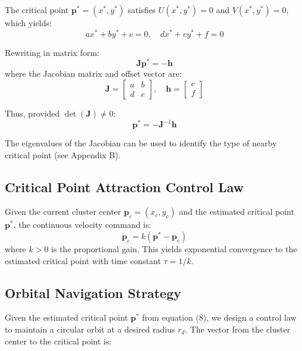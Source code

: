 \documentclass[lettersize,journal]{IEEEtran}
\begin{document}
The critical point $\mathbf{p}^* = (x^*, y^*)$ satisfies $U(x^*, y^*) = 0$ and $V(x^*, y^*) = 0$, which yields:
\begin{equation}
ax^* + by^* + c = 0, \quad dx^* + ey^* + f = 0
\end{equation}

Rewriting in matrix form:
\begin{equation}
\mathbf{J}\mathbf{p}^* = -\mathbf{h}
\end{equation}
where the Jacobian matrix and offset vector are:
\begin{equation}
\mathbf{J} = \begin{bmatrix} a & b \\ d & e \end{bmatrix}, \quad \mathbf{h} = \begin{bmatrix} c \\ f \end{bmatrix}
\end{equation}

Thus, provided $\det(\mathbf{J}) \neq 0$:
\begin{equation}
\mathbf{p}^* = -\mathbf{J}^{-1}\mathbf{h}
\end{equation}

The eigenvalues of the Jacobian can be used to identify the type of nearby critical point (see Appendix B).

\subsection{Critical Point Attraction Control Law}
Given the current cluster center $\mathbf{p}_c = (x_c, y_c)$ and the estimated critical point $\mathbf{p}^*$, the continuous velocity command is:
\begin{equation}
\dot{\mathbf{p}}_c = k(\mathbf{p}^* - \mathbf{p}_c)
\end{equation}
where $k > 0$ is the proportional gain. This yields exponential convergence to the estimated critical point with time constant $\tau = 1/k$.


\subsection{Orbital Navigation Strategy}

Given the estimated critical point $\mathbf{p}^*$ from equation (8), we design a control law to maintain a circular orbit at a desired radius $r_d$. The vector from the cluster center to the critical point is:
\end{document}
